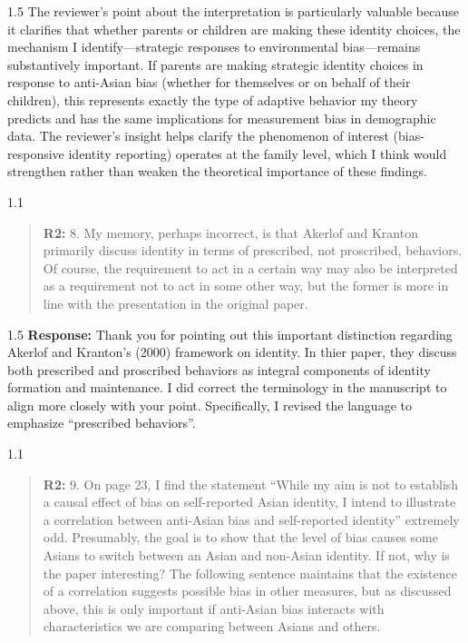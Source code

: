\documentclass[12pt,english]{article}
\newcommand{\rrquote}{1.1}
\newcommand{\rrxspc}{1.5}
\begin{document}
\begin{refsection}
\begin{spacing}{\rrxspc}
           The reviewer's point about the interpretation is particularly valuable because it clarifies that whether parents or children are making these identity choices, the mechanism I identify---strategic responses to environmental bias---remains substantively important. If parents are making strategic identity choices in response to anti-Asian bias (whether for themselves or on behalf of their children), this represents exactly the type of adaptive behavior my theory predicts and has the same implications for measurement bias in demographic data. The reviewer's insight helps clarify the phenomenon of interest (bias-responsive identity reporting) operates at the family level, which I think would strengthen rather than weaken the theoretical importance of these findings.

    \end{spacing}

    \begin{spacing}{\rrquote}
        \begin{quotation}
        \textbf{R2: } 8. My memory, perhaps incorrect, is that Akerlof and Kranton primarily discuss identity in terms of prescribed, not proscribed, behaviors. Of course, the requirement to act in a certain way may also be interpreted as a requirement not to act in some other way, but the former is more in line with the presentation in the original paper.
        \end{quotation}
        \end{spacing}
        
        \begin{spacing}{\rrxspc}
           \textbf{Response:} Thank you for pointing out this important distinction regarding Akerlof and Kranton's (2000) framework on identity. In thier paper, they discuss both prescribed and proscribed behaviors as integral components of identity formation and maintenance. I did correct the terminology in the manuscript to align more closely with your point. Specifically, I revised the language to emphasize ``prescribed behaviors''. 
    \end{spacing}

    \begin{spacing}{\rrquote}
        \begin{quotation}
        \textbf{R2: } 9. On page 23, I find the statement “While my aim is not to establish a causal effect of bias on self-reported Asian identity, I intend to illustrate a correlation between anti-Asian bias and self-reported identity” extremely odd. Presumably, the goal is to show that the level of bias causes some Asians to switch between an Asian and non-Asian identity. If not, why is the paper interesting? The following sentence maintains that the existence of a correlation suggests possible bias in other measures, but as discussed above, this is only important if anti-Asian bias interacts with characteristics we are comparing between Asians and others.
        \end{quotation}
        \end{spacing}
        

\end{refsection}
\end{document}
